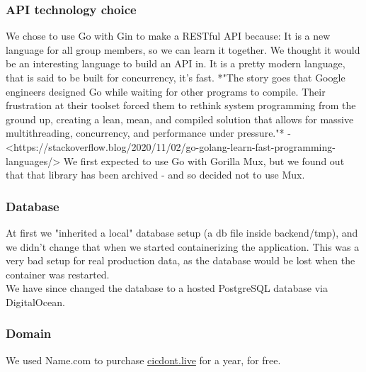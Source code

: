 \subsubsection{API technology choice}
We chose to use Go with Gin to make a RESTful API because:
It is a new language for all group members, so we can learn it together. We thought it would be an interesting language to build an API in. It is a pretty modern language, that is said to be built for concurrency, it's fast.  
*"The story goes that Google engineers designed Go while waiting for other programs to compile. Their frustration at their toolset forced them to rethink system programming from the ground up, creating a lean, mean, and compiled solution that allows for massive multithreading, concurrency, and performance under pressure."* - <https://stackoverflow.blog/2020/11/02/go-golang-learn-fast-programming-languages/>
We first expected to use Go with Gorilla Mux, but we found out that that library has been archived - and so decided not to use Mux.
\subsubsection{Database}
At first we "inherited a local" database setup (a db file inside backend/tmp), and we didn't change that when we started containerizing the application. This was a very bad setup for real production data, as the database would be lost when the container was restarted. \\
We have since changed the database to a hosted PostgreSQL database via DigitalOcean.
\subsubsection{Domain}
We used Name.com to purchase \url{cicdont.live} for a year, for free.

